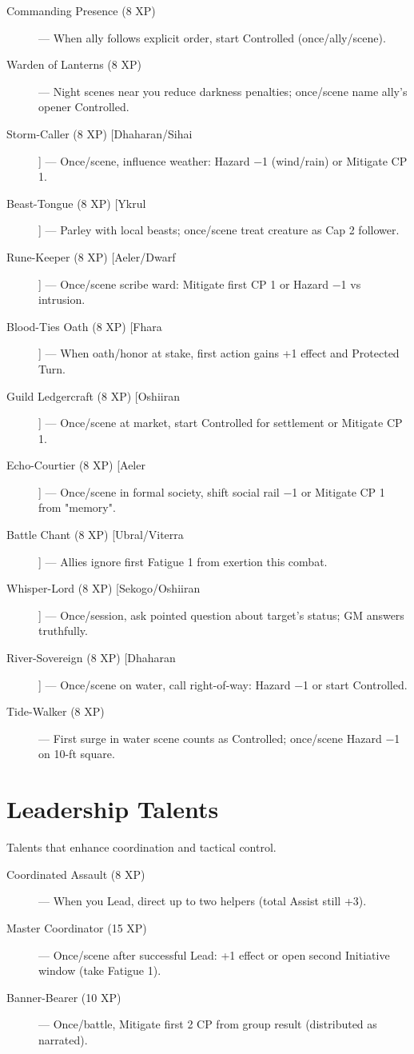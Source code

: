 \begin{description}
  \item[Commanding Presence (8 XP)] — When ally follows explicit order, start Controlled (once/ally/scene).
  \item[Warden of Lanterns (8 XP)] — Night scenes near you reduce darkness penalties; once/scene name ally's opener Controlled.
  \item[Storm-Caller (8 XP) [Dhaharan/Sihai]] — Once/scene, influence weather: Hazard −1 (wind/rain) or Mitigate CP 1.
  \item[Beast-Tongue (8 XP) [Ykrul]] — Parley with local beasts; once/scene treat creature as Cap 2 follower.
  \item[Rune-Keeper (8 XP) [Aeler/Dwarf]] — Once/scene scribe ward: Mitigate first CP 1 or Hazard −1 vs intrusion.
  \item[Blood-Ties Oath (8 XP) [Fhara]] — When oath/honor at stake, first action gains +1 effect and Protected Turn.
  \item[Guild Ledgercraft (8 XP) [Oshiiran]] — Once/scene at market, start Controlled for settlement or Mitigate CP 1.
  \item[Echo-Courtier (8 XP) [Aeler]] — Once/scene in formal society, shift social rail −1 or Mitigate CP 1 from "memory".
  \item[Battle Chant (8 XP) [Ubral/Viterra]] — Allies ignore first Fatigue 1 from exertion this combat.
  \item[Whisper-Lord (8 XP) [Sekogo/Oshiiran]] — Once/session, ask pointed question about target's status; GM answers truthfully.
  \item[River-Sovereign (8 XP) [Dhaharan]] — Once/scene on water, call right-of-way: Hazard −1 or start Controlled.
  \item[Tide-Walker (8 XP)] — First surge in water scene counts as Controlled; once/scene Hazard −1 on 10-ft square.
\end{description}

\section{Leadership Talents}

Talents that enhance coordination and tactical control.

\begin{description}
  \item[Coordinated Assault (8 XP)] — When you Lead, direct up to two helpers (total Assist still +3).
  \item[Master Coordinator (15 XP)] — Once/scene after successful Lead: +1 effect or open second Initiative window (take Fatigue 1).
  \item[Banner-Bearer (10 XP)] — Once/battle, Mitigate first 2 CP from group result (distributed as narrated).
\end{description}

